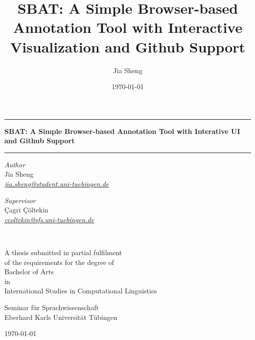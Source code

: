 \documentclass[a4paper]{article}
\title{SBAT: A Simple Browser-based Annotation Tool with Interactive Visualization and Github Support}
\author{Jia Sheng}
\date{\today}
\begin{document}
\begin{titlepage}
\begin{center}

\hrule
\vspace{0.6cm}
{\bfseries\LARGE
SBAT: A Simple Browser-based Annotation Tool with Interative UI and Github Support
}\\[1cm]
\hrule
\vspace*{.05\textheight}
 
\begin{minipage}[t]{0.49\textwidth}
\begin{flushleft}
{\large
\textit{Author}\\
Jia Sheng}\\
\href{mailto:jia.sheng@student.uni-tuebingen.de}{\textit{jia.sheng@student.uni-tuebingen.de}}\\
\end{flushleft}
\end{minipage}
\begin{minipage}[t]{0.49\textwidth}
\begin{flushright}
{\large
\textit{Supervisor}\\
Çagri Çöltekin}\\
\href{mailto:ccoltekin@sfs.uni-tuebingen.de}{\textit{ccoltekin@sfs.uni-tuebingen.de}}\\
\end{flushright}
\end{minipage}\\

\vfill

A thesis submitted in partial fulfilment\\
of the requirements for the degree of\\[2mm]
{\large Bachelor of Arts}\\
in\\[1mm]
{\large International Studies in Computational Linguistics}

\vspace*{.1\textheight}

{\large Seminar für Sprachwissenschaft\\
Eberhard Karls Universität Tübingen

\vspace{1em}
\today}
\end{center}
\end{titlepage}

\end{document}
